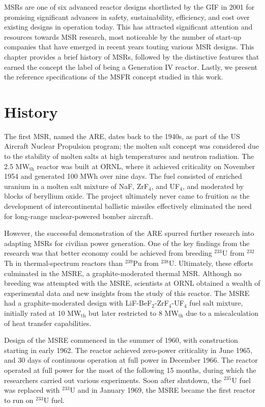 \glspl{MSR} are one of six advanced reactor designs shortlisted by
the \gls{GIF} in 2001 for promising significant advances in safety,
sustainability, efficiency, and cost over existing designs in operation
today. This has attracted significant attention and resources towards
\gls{MSR} research, most noticeable by the number of start-up companies that
have emerged in recent years touting various \gls{MSR} designs. This chapter
provides a brief history of \glspl{MSR}, followed by the distinctive features
that earned the concept the label of being a Generation IV reactor. Lastly,
we present the reference specifications of the \gls{MSFR} concept studied in
this work.

\section{History}

The first \gls{MSR}, named the \gls{ARE}, dates back to the 1940s,
as part of the US Aircraft Nuclear Propulsion program; the molten salt
concept was considered due to the stability of molten salts at high
temperatures and neutron radiation. The 2.5
MW$_{\text{th}}$ reactor was built at \gls{ORNL}, where it achieved
criticality on November 1954 and generated 100 MWh over nine days. The fuel
consisted of enriched uranium in a molten salt mixture of NaF, ZrF$_4$, and
UF$_4$, and moderated by blocks of beryllium oxide. The project ultimately
never came to fruition as the development of intercontinental ballistic
missiles effectively eliminated the need for long-range nuclear-powered
bomber aircraft.

However, the successful demonstration of the \gls{ARE} spurred further
research into adapting \glspl{MSR} for civilian power generation. One of the
key findings from the
research was that better economy could be achieved from breeding $^{233}$U
from $^{232}$Th in thermal-spectrum reactors than $^{239}$Pu from $^{238}$U.
Ultimately, these efforts culminated in the \gls{MSRE}, a graphite-moderated
thermal \gls{MSR}.
Although no breeding was attempted with the \gls{MSRE}, scientists at
\gls{ORNL} obtained a wealth of experimental data and new insights from the
study of this reactor. The \gls{MSRE} had a graphite-moderated design with
LiF-BeF$_2$-ZrF$_4$-UF$_4$ fuel salt mixture, initially rated at 10
MW$_{\text{th}}$ but later restricted to 8 MW$_{\text{th}}$ due to a
miscalculation of heat transfer capabilities. 

Design of the \gls{MSRE} commenced in the summer of 1960, with construction
starting in early 1962. The reactor achieved zero-power criticality in June
1965, and 30 days of continuous operation at full power in December 1966.
The reactor operated at full power for the most of the following 15 months,
during which the researchers carried out various experiments. Soon after
shutdown, the $^{235}$U fuel was replaced with $^{233}$U and in January
1969, the \gls{MSRE} became the first reactor to run on $^{233}$U fuel.

